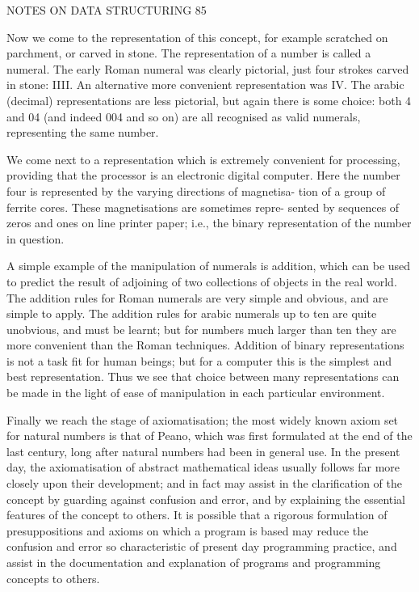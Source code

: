 NOTES ON DATA STRUCTURING 85

Now we come to the representation of this concept, for example scratched on parchment, or carved in stone. The representation of a number is called a numeral. The early Roman numeral was clearly pictorial, just four strokes carved in stone: IIII. An alternative more convenient representation was IV. The arabic (decimal) representations are less pictorial, but again there is some choice: both 4 and 04 (and indeed 004 and so on) are all recognised as valid numerals, representing the same number.

We come next to a representation which is extremely convenient for processing, providing that the processor is an electronic digital computer. Here the number four is represented by the varying directions of magnetisa- tion of a group of ferrite cores. These magnetisations are sometimes repre- sented by sequences of zeros and ones on line printer paper; i.e., the binary representation of the number in question.

A simple example of the manipulation of numerals is addition, which can be used to predict the result of adjoining of two collections of objects in the real world. The addition rules for Roman numerals are very simple and obvious, and are simple to apply. The addition rules for arabic numerals up to ten are quite unobvious, and must be learnt; but for numbers much larger than ten they are more convenient than the Roman techniques. Addition of binary representations is not a task fit for human beings; but for a computer this is the simplest and best representation. Thus we see that choice between many representations can be made in the light of ease of manipulation in each particular environment.

Finally we reach the stage of axiomatisation; the most widely known axiom set for natural numbers is that of Peano, which was first formulated at the end of the last century, long after natural numbers had been in general use. In the present day, the axiomatisation of abstract mathematical ideas usually follows far more closely upon their development; and in fact may assist in the clarification of the concept by guarding against confusion and error, and by explaining the essential features of the concept to others. It is possible that a rigorous formulation of presuppositions and axioms on which a program is based may reduce the confusion and error so characteristic of present day programming practice, and assist in the documentation and explanation of programs and programming concepts to others.

